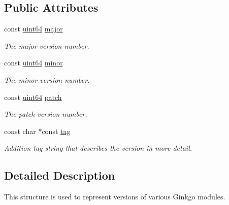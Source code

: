 \subsection*{Public Attributes}
\begin{DoxyCompactItemize}
\item 
\mbox{\label{structgko_1_1version_a019ce1d31714612e0c77c8ef5eb4cfde}} 
const \hyperlink{namespacegko_ad54a79afecd57aabbb04b1dc611ae55e}{uint64} \hyperlink{structgko_1_1version_a019ce1d31714612e0c77c8ef5eb4cfde}{major}
\begin{DoxyCompactList}\small\item\em The major version number. \end{DoxyCompactList}\item 
\mbox{\label{structgko_1_1version_abb548e6dca39e0a3718ecf13cafbba36}} 
const \hyperlink{namespacegko_ad54a79afecd57aabbb04b1dc611ae55e}{uint64} \hyperlink{structgko_1_1version_abb548e6dca39e0a3718ecf13cafbba36}{minor}
\begin{DoxyCompactList}\small\item\em The minor version number. \end{DoxyCompactList}\item 
\mbox{\label{structgko_1_1version_a7580f68f7cf0600bc620c47ed6330c95}} 
const \hyperlink{namespacegko_ad54a79afecd57aabbb04b1dc611ae55e}{uint64} \hyperlink{structgko_1_1version_a7580f68f7cf0600bc620c47ed6330c95}{patch}
\begin{DoxyCompactList}\small\item\em The patch version number. \end{DoxyCompactList}\item 
const char $\ast$const \hyperlink{structgko_1_1version_a1bd0eaa4d551c145ff9cd0c10e555ac3}{tag}
\begin{DoxyCompactList}\small\item\em Addition tag string that describes the version in more detail. \end{DoxyCompactList}\end{DoxyCompactItemize}


\subsection{Detailed Description}
This structure is used to represent versions of various Ginkgo modules. 

